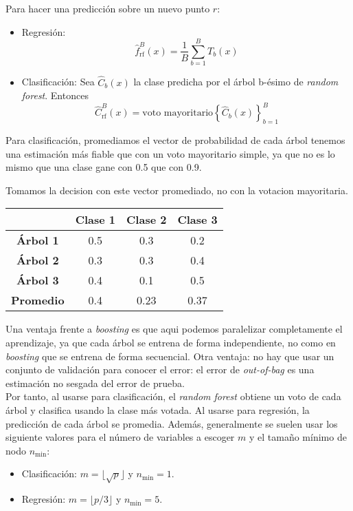 \noindent Para hacer una predicción sobre un nuevo punto $r$: 
\begin{itemize}
\item Regresión:
\begin{equation}
\hat{f}_{\text{rf}}^B(x) = \frac{1}{B} \sum_{b=1}^{B} T_b(x)
\end{equation}
\item Clasificación: Sea $\hat{C}_b (x)$ la clase predicha por el árbol b-ésimo de \textit{random forest}. Entonces
\begin{equation}
\hat{C}_{\text{rf}}^B(x) = \text{voto mayoritario} \left\{ \hat{C}_b(x) \right\}_{b = 1}^B
\end{equation}
\end{itemize}

Para clasificación, promediamos el vector de probabilidad de cada árbol tenemos una estimación más fiable que con un voto mayoritario simple, ya que no es lo mismo que una clase gane con 0.5 que con 0.9. 
\begin{example}
Tomamos la decision con este vector promediado, no con la votacion mayoritaria.
\begin{table}[H]
\centering
\begin{tabular}{cccc}
\toprule
 & \textbf{Clase 1} & \textbf{Clase 2} & \textbf{Clase 3} \\
\midrule
\textbf{Árbol 1} & 0.5 & 0.3 & 0.2 \\
\textbf{Árbol 2} & 0.3 & 0.3 & 0.4 \\
\textbf{Árbol 3} & 0.4 & 0.1 & 0.5 \\
\midrule
\textbf{Promedio} & 0.4 & 0.23 & 0.37 \\
\bottomrule
\end{tabular}
\end{table} 
\end{example}

Una ventaja frente a \textit{boosting} es que aqui podemos paralelizar completamente el aprendizaje, ya que cada árbol se entrena de forma independiente, no como en \textit{boosting} que se entrena de forma secuencial. Otra ventaja: no hay que usar un conjunto de validación para conocer el error: el error de \textit{out-of-bag} es una estimación no sesgada del error de prueba. \\

Por tanto, al usarse para clasificación, el \textit{random forest} obtiene un voto de cada árbol y clasifica usando la clase más votada. Al usarse para regresión, la predicción de cada árbol se promedia. Además, generalmente se suelen usar los siguiente valores para el número de variables a escoger $m$ y el tamaño mínimo de nodo $n_{\text{min}}$:
\begin{itemize}
\item Clasificación: $m = \lfloor\sqrt{p}\rfloor$ y $n_{\text{min}} = 1$.
\item Regresión: $m = \lfloor p/3\rfloor$ y $n_{\text{min}} = 5$.
\end{itemize}

